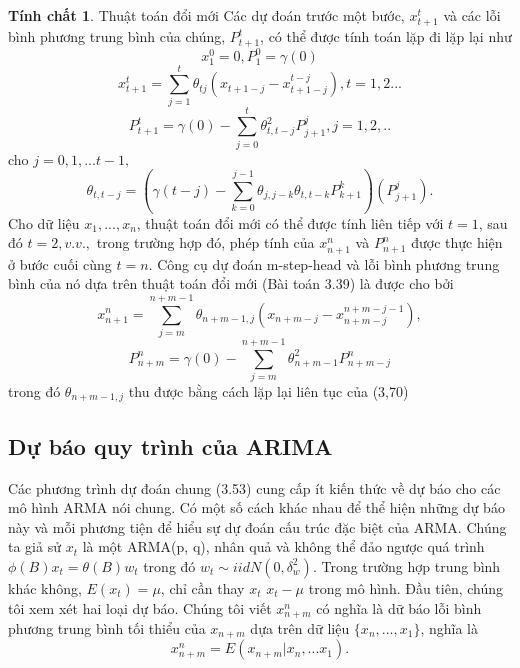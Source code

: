 \documentclass[12pt, a4paper,oneside]{book}
\theoremstyle{definition}
\newtheorem{tc}[theo]{Tính chất}
\begin{document}
\begin{tc}
	Thuật toán đổi mới	
	Các dự đoán trước một bước, $x_{t+1}^{t}$ và các lỗi bình phương trung bình của chúng, $P_{t+1}^{t}$, có thể được tính toán lặp đi lặp lại như
	$$x_{1}^{0}=0, P_{1}^{0} =\gamma(0)$$
	$$x_{t+1}^{t} = \sum_{j=1}^{t}\theta_{tj}(x_{t+1-j} - x_{t+1-j}^{t-j}), t= 1,2...$$
	$$P_{t+1}^{t} = \gamma(0) - \sum_{j=0}^{t}\theta^{2}_{t,t-j}P_{j+1}^{j}, j=1,2,..$$
	cho $j=0,1,...t-1,$
	$$\theta_{t,t-j}= (\gamma(t-j) - \sum_{k=0}^{j-1}\theta_{j,j-k}\theta_{t,t-k}P_{k+1}^{k})(P_{j+1}^{j}).$$
	Cho dữ liệu $x_{1} ,. . . , x_{n}$, thuật toán đổi mới có thể được tính liên tiếp với $t = 1$, sau đó $t = 2, v.v.,$ trong trường hợp đó, phép tính của $x^{n}_{n+1}$ và $P^{n}_{n+1}$ được thực hiện ở bước cuối cùng $t = n$. Công cụ dự đoán m-step-head và lỗi bình phương trung bình của nó dựa trên thuật toán đổi mới (Bài toán 3.39) là được cho bởi
	$$x_{n+1}^{n} = \sum_{j=m}^{n+m-1}\theta_{n+m-1,j}(x_{n+m-j}- x^{n+m-j-1}_{n+m-j}),$$
	$$P_{n+m}^{n}=  \gamma(0) - \sum_{j=m}^{n+m-1}\theta^{2}_{n+m-1}P_{n+m-j}^{n}$$
	trong đó $\theta_{n+m-1,j}$ thu được bằng cách lặp lại liên tục của (3,70)
\end{tc}
\subsection*{Dự báo quy trình của ARIMA}
Các phương trình dự đoán chung (3.53) cung cấp ít kiến thức về dự báo cho các mô hình ARMA nói chung. Có một số cách khác nhau để thể hiện những dự báo này và mỗi phương tiện để hiểu sự dự đoán cấu trúc đặc biệt của ARMA. Chúng ta giả sử $x_{t}$ là một ARMA(p, q), nhân quả và không thể đảo ngược quá trình   $\phi(B)x_{t} = \theta(B)w_{t}$ trong đó $w_{t} \sim iid N(0,\delta_{w}^{2})$. Trong trường hợp trung bình khác không, $E(x_{t})=\mu$, chỉ cần thay $x_{t}$ $x_{t}-\mu$ trong mô hình. Đầu tiên, chúng tôi xem xét hai loại dự báo. Chúng tôi viết $x_{n+m}^{n}$ có nghĩa là dữ báo lỗi bình phương trung bình tối thiểu của $x_{n+m}$ dựa trên dữ liệu $\{x_{n},...,x_{1}\}$, nghĩa là $$x_{n+m}^{n} = E(x_{n+m}|x_{n},...x_{1}).$$
\end{document}

